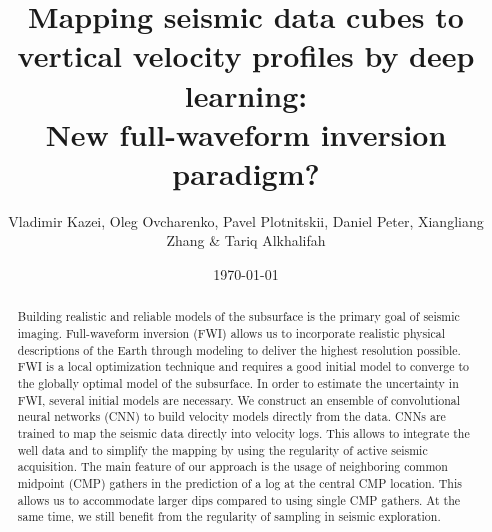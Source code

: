 \documentclass[manuscript]{geophysics}
\begin{document}
\title{Mapping seismic data cubes to vertical velocity profiles by deep learning: \\
	New full-waveform inversion paradigm?}

\renewcommand{\thefootnote}{\fnsymbol{footnote}} 

\author{Vladimir Kazei\footnotemark[1], Oleg Ovcharenko, Pavel Plotnitskii, Daniel Peter, Xiangliang Zhang \& Tariq Alkhalifah}
\address{
\footnotemark[1] KAUST, Saudi Arabia}
\date{\today}


\maketitle

\begin{abstract}
	Building realistic and reliable models of the subsurface is the primary goal of seismic imaging.
	Full-waveform inversion (FWI) allows us to incorporate realistic physical descriptions of the Earth through modeling to deliver the highest resolution possible.
	FWI is a local optimization technique and requires a good initial model to converge to the globally optimal model of the subsurface.
	In order to estimate the uncertainty in FWI, several initial models are necessary.
	We construct an ensemble of convolutional neural networks (CNN) to build velocity models directly from the data. 
	CNNs are trained to map the seismic data directly into velocity logs. This allows to integrate the well data and to simplify the mapping by using the regularity of active seismic acquisition. 
	The main feature of our approach is the usage of neighboring common midpoint (CMP) gathers in the prediction of a log at the central CMP location. This allows us to accommodate larger dips compared to using single CMP gathers. At the same time, we still benefit from the regularity of sampling in seismic exploration.  
\end{abstract}

\end{document}
